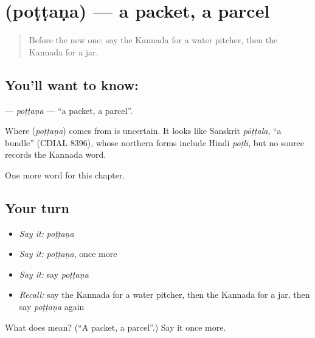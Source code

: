 \section[\texorpdfstring{\kn{ಪೊಟ್ಟಣ} (poṭṭaṇa)}{ಪೊಟ್ಟಣ (poṭṭaṇa)}]{ (poṭṭaṇa) — a packet, a parcel}

\label{lesson:KA-C265-pottana}



\begin{quote}
Before the new one: say the Kannada for a water pitcher, then the Kannada for a jar.
\end{quote}

\subsection*{You'll want to know: }
\textbf{} — \emph{poṭṭaṇa} — \textquotedblleft{}a packet, a parcel\textquotedblright{}.

\begin{cousinweb}
Where \textbf{} (\emph{poṭṭaṇa}) comes from is uncertain. It looks like Sanskrit \emph{pōṭṭala}, \textquotedblleft{}a bundle\textquotedblright{} (CDIAL 8396), whose northern forms include Hindi \emph{poṭlī}, but no source records the Kannada word.
\end{cousinweb}

\begin{grammarlens}[title={What you've built}]
One more word for this chapter.
\end{grammarlens}

\subsection*{Your turn}
\begin{itemize}
\raggedright
  \item \emph{Say it:} \emph{poṭṭaṇa}
  \item \emph{Say it:} \emph{poṭṭaṇa}, once more
  \item \emph{Say it:} say \emph{poṭṭaṇa}
  \item \emph{Recall:} say the Kannada for a water pitcher, then the Kannada for a jar, then say \emph{poṭṭaṇa} again
\end{itemize}

\begin{tcolorbox}[breakable,colback=teal!4,colframe=teal!35!black,title={Before you move on}]
What does  mean? (\textquotedblleft{}A packet, a parcel\textquotedblright{}.) Say it once more.
\end{tcolorbox}
